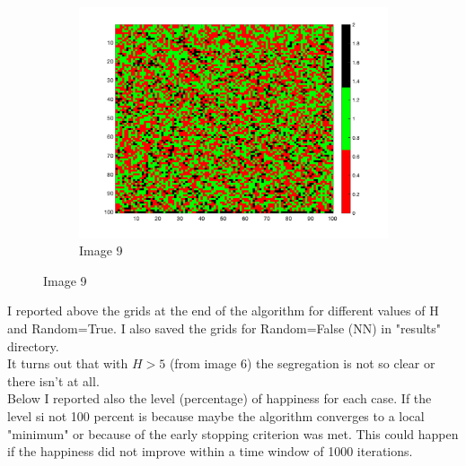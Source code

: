 \documentclass[unicode,11pt,a4paper,oneside,numbers=endperiod,openany]{scrartcl}
\begin{document}
\begin{figure}[H]
\begin{subfigure}[b]{0.3\textwidth}
        \includegraphics[width=\textwidth]{results/iterations_1002_H_9_random_1.png}
        \caption{Image 9}
        \label{fig:image9}
      \end{subfigure}
      
\end{figure}
I reported above the grids at the end of the algorithm for different values of H and Random=True. 
I also saved the grids for Random=False (NN) in "results" directory. \\
It turns out that with $H>5$ (from image 6) the segregation is not so clear or there isn't at all. \\
Below I reported also the level (percentage) of happiness for each case. If the level si not 100 percent is because maybe the algorithm converges to a local "minimum" or because of the early stopping criterion was met. This could happen if the happiness did not improve within a time window of 1000 iterations. 
\end{document}
